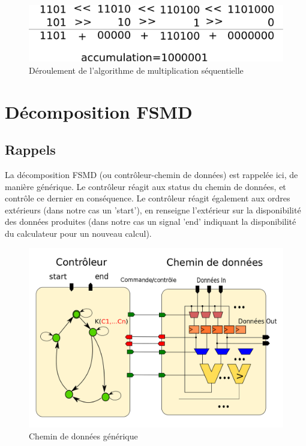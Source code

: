 \documentclass[a4paper,11pt]{article}
\begin{document}
\begin{figure}[!h]
\begin{center}
\includegraphics[scale=0.3]{./figures/algo.png}
\end{center}
\caption{Déroulement de l'algorithme de multiplication séquentielle}
\end{figure}
\FloatBarrier

\section{Décomposition FSMD}

\subsection{Rappels}
La décomposition FSMD (ou contrôleur-chemin de données) est rappelée ici, de manière générique. Le contrôleur réagit aux status du chemin de données, et contrôle ce dernier en conséquence. Le contrôleur réagit également aux ordres extérieurs (dans notre cas un 'start'), en renseigne l'extérieur sur la disponibilité des données produites (dans notre cas un signal 'end' indiquant la disponibilité du calculateur pour un nouveau calcul).

\begin{figure}[!h]
\begin{center}
\includegraphics[scale=0.3]{./figures/FSMD-2.png}
\end{center}
\caption{Chemin de données générique}
\end{figure}
\FloatBarrier
\end{document}
